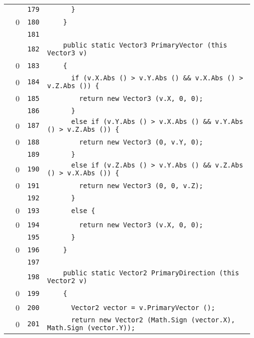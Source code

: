 \documentclass[a4paper,10pt]{article}
\begin{document}
\begin{longtable}[l]{lrrl}
\cellcolor{gray} &  & \verb~179~ & \verb~      }~\\
\cellcolor{red} & 0 & \verb~180~ & \verb~    }~\\
\cellcolor{gray} &  & \verb~181~ & \verb~~\\
\cellcolor{gray} &  & \verb~182~ & \verb~    public static Vector3 PrimaryVector (this Vector3 v)~\\
\cellcolor{red} & 0 & \verb~183~ & \verb~    {~\\
\cellcolor{red} & 0 & \verb~184~ & \verb~      if (v.X.Abs () > v.Y.Abs () && v.X.Abs () > v.Z.Abs ()) {~\\
\cellcolor{red} & 0 & \verb~185~ & \verb~        return new Vector3 (v.X, 0, 0);~\\
\cellcolor{gray} &  & \verb~186~ & \verb~      }~\\
\cellcolor{red} & 0 & \verb~187~ & \verb~      else if (v.Y.Abs () > v.X.Abs () && v.Y.Abs () > v.Z.Abs ()) {~\\
\cellcolor{red} & 0 & \verb~188~ & \verb~        return new Vector3 (0, v.Y, 0);~\\
\cellcolor{gray} &  & \verb~189~ & \verb~      }~\\
\cellcolor{red} & 0 & \verb~190~ & \verb~      else if (v.Z.Abs () > v.Y.Abs () && v.Z.Abs () > v.X.Abs ()) {~\\
\cellcolor{red} & 0 & \verb~191~ & \verb~        return new Vector3 (0, 0, v.Z);~\\
\cellcolor{gray} &  & \verb~192~ & \verb~      }~\\
\cellcolor{red} & 0 & \verb~193~ & \verb~      else {~\\
\cellcolor{red} & 0 & \verb~194~ & \verb~        return new Vector3 (v.X, 0, 0);~\\
\cellcolor{gray} &  & \verb~195~ & \verb~      }~\\
\cellcolor{red} & 0 & \verb~196~ & \verb~    }~\\
\cellcolor{gray} &  & \verb~197~ & \verb~~\\
\cellcolor{gray} &  & \verb~198~ & \verb~    public static Vector2 PrimaryDirection (this Vector2 v)~\\
\cellcolor{red} & 0 & \verb~199~ & \verb~    {~\\
\cellcolor{red} & 0 & \verb~200~ & \verb~      Vector2 vector = v.PrimaryVector ();~\\
\cellcolor{red} & 0 & \verb~201~ & \verb~      return new Vector2 (Math.Sign (vector.X), Math.Sign (vector.Y));~\\

\end{longtable}
\end{document}
